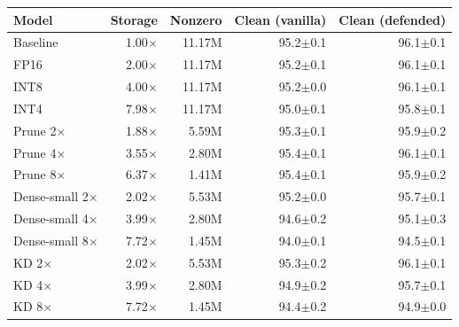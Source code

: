 \begin{tabular}{lrrrr}
\toprule
Model & Storage & Nonzero & Clean (vanilla) & Clean (defended) \\
\midrule
Baseline & 1.00$\times$ & 11.17M & 95.2{\scriptsize$\pm$0.1} & 96.1{\scriptsize$\pm$0.1} \\
\midrule
FP16 & 2.00$\times$ & 11.17M & 95.2{\scriptsize$\pm$0.1} & 96.1{\scriptsize$\pm$0.1} \\
INT8 & 4.00$\times$ & 11.17M & 95.2{\scriptsize$\pm$0.0} & 96.1{\scriptsize$\pm$0.1} \\
INT4 & 7.98$\times$ & 11.17M & 95.0{\scriptsize$\pm$0.1} & 95.8{\scriptsize$\pm$0.1} \\
\midrule
Prune 2$\times$ & 1.88$\times$ & 5.59M & 95.3{\scriptsize$\pm$0.1} & 95.9{\scriptsize$\pm$0.2} \\
Prune 4$\times$ & 3.55$\times$ & 2.80M & 95.4{\scriptsize$\pm$0.1} & 96.1{\scriptsize$\pm$0.1} \\
Prune 8$\times$ & 6.37$\times$ & 1.41M & 95.4{\scriptsize$\pm$0.1} & 95.9{\scriptsize$\pm$0.2} \\
\midrule
Dense-small 2$\times$ & 2.02$\times$ & 5.53M & 95.2{\scriptsize$\pm$0.0} & 95.7{\scriptsize$\pm$0.1} \\
Dense-small 4$\times$ & 3.99$\times$ & 2.80M & 94.6{\scriptsize$\pm$0.2} & 95.1{\scriptsize$\pm$0.3} \\
Dense-small 8$\times$ & 7.72$\times$ & 1.45M & 94.0{\scriptsize$\pm$0.1} & 94.5{\scriptsize$\pm$0.1} \\
\midrule
KD 2$\times$ & 2.02$\times$ & 5.53M & 95.3{\scriptsize$\pm$0.2} & 96.1{\scriptsize$\pm$0.1} \\
KD 4$\times$ & 3.99$\times$ & 2.80M & 94.9{\scriptsize$\pm$0.2} & 95.7{\scriptsize$\pm$0.1} \\
KD 8$\times$ & 7.72$\times$ & 1.45M & 94.4{\scriptsize$\pm$0.2} & 94.9{\scriptsize$\pm$0.0} \\
\bottomrule
\end{tabular}
